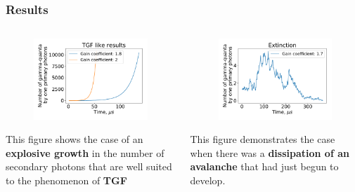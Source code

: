 \documentclass[8pt,pdf,hyperref={unicode}]{beamer}
\begin{document}
\begin{frame}
    \frametitle{Results}
\begin{columns}
	\begin{column}{0.5\textwidth}
		\begin{figure}[htb]
		\centering
		\includegraphics[width=1\columnwidth]{proofTGF.pdf}
		\end{figure}
		{\LARGE This figure shows the case of an \textbf{explosive growth} in the number of secondary photons that are well suited to the phenomenon of \textbf{TGF}}
	\end{column}
	\begin{column}{0.5\textwidth}
		\begin{figure}[htb]
			\centering
			\includegraphics[width=1\columnwidth]{Extinction.pdf}
		\end{figure}
	{\LARGE 	This figure demonstrates the case when there was a \textbf{dissipation of an avalanche} that had just begun to develop.}

	\end{column}
\end{columns}
    
\end{frame}
\end{document}
